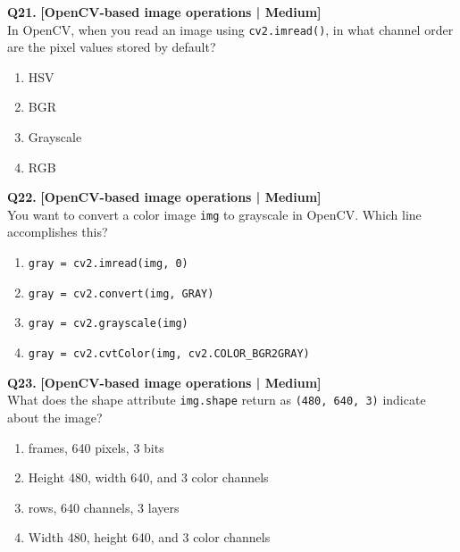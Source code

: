 \noindent\textbf{Q21.} \hfill {\small\color{LPUOrange}\textbf{[OpenCV-based image operations | Medium]}}\\[2pt]
In OpenCV, when you read an image using \texttt{cv2.imread()}, in what channel order are the pixel values stored by default?

\begin{enumerate}[label=(\alph*),topsep=2pt,itemsep=1pt,partopsep=0pt,parsep=0pt]
    \item \relax HSV
    \item \relax BGR
    \item \relax Grayscale
    \item \relax RGB
\end{enumerate}
\vspace{2mm}

\noindent\textbf{Q22.} \hfill {\small\color{LPUOrange}\textbf{[OpenCV-based image operations | Medium]}}\\[2pt]
You want to convert a color image \texttt{img} to grayscale in OpenCV. Which line accomplishes this?

\begin{enumerate}[label=(\alph*),topsep=2pt,itemsep=1pt,partopsep=0pt,parsep=0pt]
    \item \relax \texttt{gray = cv2.imread(img, 0)}
    \item \relax \texttt{gray = cv2.convert(img, GRAY)}
    \item \relax \texttt{gray = cv2.grayscale(img)}
    \item \relax \texttt{gray = cv2.cvtColor(img, cv2.COLOR\_BGR2GRAY)}
\end{enumerate}
\vspace{2mm}

\noindent\textbf{Q23.} \hfill {\small\color{LPUOrange}\textbf{[OpenCV-based image operations | Medium]}}\\[2pt]
What does the shape attribute \texttt{img.shape} return as \texttt{(480, 640, 3)} indicate about the image?

\begin{enumerate}[label=(\alph*),topsep=2pt,itemsep=1pt,partopsep=0pt,parsep=0pt]
    \item {} frames, 640 pixels, 3 bits
    \item \relax Height 480, width 640, and 3 color channels
    \item {} rows, 640 channels, 3 layers
    \item \relax Width 480, height 640, and 3 color channels
\end{enumerate}
\vspace{2mm}

